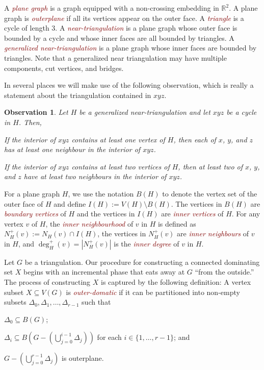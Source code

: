 \documentclass{article}
\newtheorem{obs}{Observation}
\newcommand{\defin}[1]{\emph{\textcolor{Maroon}{#1}}}
\theoremstyle{definition}
\begin{document}
A \defin{plane graph} is a graph equipped with a non-crossing embedding in $\mathbb{R}^2$.  A plane graph is \defin{outerplane} if all its vertices appear on the outer face.  A \defin{triangle} is a cycle of length $3$. A \defin{near-triangulation} is a plane graph whose outer face is bounded by a cycle and whose inner faces are all bounded by triangles.  A \defin{generalized near-triangulation} is a plane graph whose inner faces are bounded by triangles. Note that a generalized near triangulation may have multiple components, cut vertices, and bridges.

In several places we will make use of the following observation, which is really a statement about the triangulation contained in $xyz$.
\begin{obs}\label{useful_little_guy}
  Let $H$ be a generalized near-triangulation and let $xyz$ be a cycle in $H$.  Then,
  \begin{compactenum}
    \item If the interior of $xyz$ contains at least one vertex of $H$, then each of $x$, $y$, and $z$ has at least one neighbour in the interior of $xyz$.

    \item If the interior of $xyz$ contains at least two vertices of $H$, then at least two of $x$, $y$, and $z$ have at least two neighbours in the interior of $xyz$.
  \end{compactenum}
\end{obs}

For a plane graph $H$, we use the notation $B(H)$ to denote the vertex set of the outer face of $H$ and define $I(H):=V(H)\setminus B(H)$.  The vertices in $B(H)$ are \defin{boundary vertices} of $H$ and the vertices in $I(H)$ are \defin{inner vertices} of $H$. For any vertex $v$ of $H$, the \defin{inner neighbourhood} of $v$ in $H$ is defined as $N_H^+(v):=N_H(v)\cap I(H)$, the vertices in $N^+_H(v)$ are \defin{inner neighbours} of $v$ in $H$, and $\deg^+_H(v)=|N^+_H(v)|$ is the \defin{inner degree} of $v$ in $H$.

Let $G$ be a triangulation.  Our procedure for constructing a connected dominating set $X$ begins with an incremental phase that eats away at $G$ ``from the outside.'' The process of constructing $X$ is captured by the following definition:   A vertex subset $X\subseteq V(G)$ is \defin{outer-domatic} if it can be partitioned into non-empty subsets $\Delta_0,\Delta_1,\ldots,\Delta_{r-1}$ such that
\begin{compactenum}[(P1)]
    \item $\Delta_0\subseteq B(G)$; \label{outer_face}
    \item $\Delta_i\subseteq B(G-(\bigcup_{j=0}^{i-1}\Delta_j))$ for each $i\in\{1,\ldots,r-1\}$; and \label{incremental}
    \item $G-(\bigcup_{j=0}^{r-1}\Delta_j)$ is outerplane. \label{outerplanar}
\end{compactenum}
\end{document}
